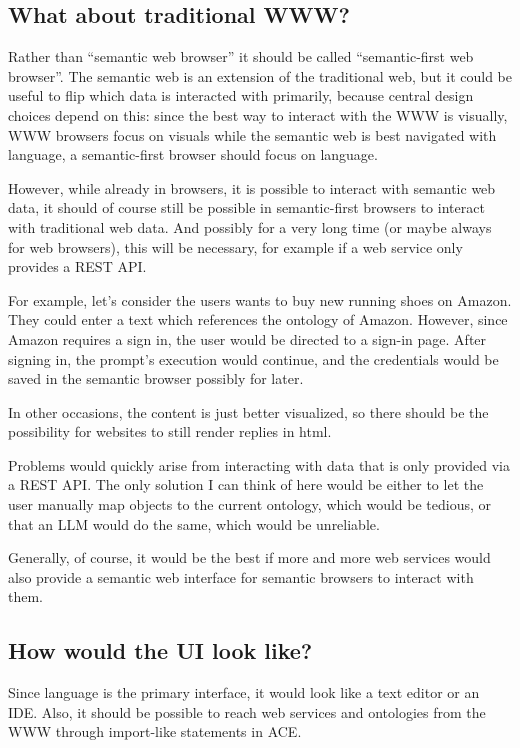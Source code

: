\documentclass[12pt,a4paper]{article}
\begin{document}
\subsection{What about traditional WWW?}

Rather than ``semantic web browser'' it should be called ``semantic-first web browser''. The semantic web is an extension of the traditional web, but it could be useful to flip which data is interacted with primarily, because central design choices depend on this: since the best way to interact with the WWW is visually, WWW browsers focus on visuals while the semantic web is best navigated with language, a semantic-first browser should focus on language.

However, while already in browsers, it is possible to interact with semantic web data, it should of course still be possible in semantic-first browsers to interact with traditional web data. And possibly for a very long time (or maybe always for web browsers), this will be necessary, for example if a web service only provides a REST API.

For example, let's consider the users wants to buy new running shoes on Amazon. They could enter a text which references the ontology of Amazon. However, since Amazon requires a sign in, the user would be directed to a sign-in page. After signing in, the prompt's execution would continue, and the credentials would be saved in the semantic browser possibly for later.

In other occasions, the content is just better visualized, so there should be the possibility for websites to still render replies in html.

Problems would quickly arise from interacting with data that is only provided via a REST API. The only solution I can think of here would be either to let the user manually map objects to the current ontology, which would be tedious, or that an LLM would do the same, which would be unreliable.

Generally, of course, it would be the best if more and more web services would also provide a semantic web interface for semantic browsers to interact with them.

\subsection{How would the UI look like?}

Since language is the primary interface, it would look like a text editor or an IDE. Also, it should be possible to reach web services and ontologies from the WWW through import-like statements in ACE.
\end{document}
